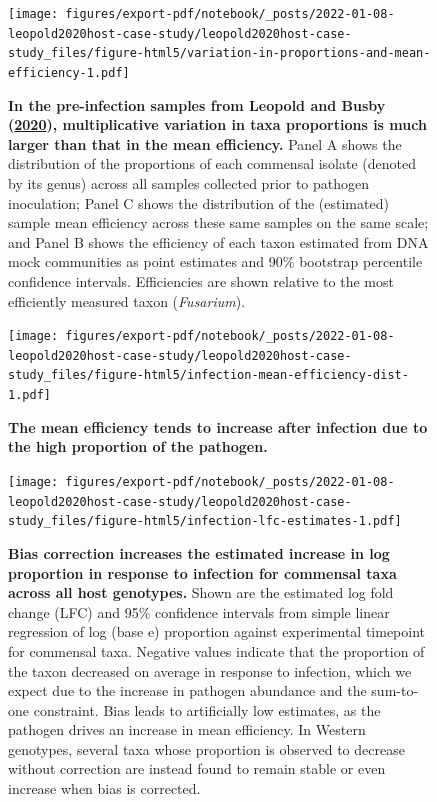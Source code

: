 \documentclass[
]{article}
\begin{document}
\begin{figure}
\centering
\texttt{[image: figures/export-pdf/notebook/\_posts/2022-01-08-leopold2020host-case-study/leopold2020host-case-study\_files/figure-html5/variation-in-proportions-and-mean-efficiency-1.pdf]}
\caption{\label{fig:leopold2020host-variation}\textbf{In the pre-infection samples from Leopold and Busby (\protect\hyperlink{ref-leopold2020host}{2020}), multiplicative variation in taxa proportions is much larger than that in the mean efficiency.} Panel A shows the distribution of the proportions of each commensal isolate (denoted by its genus) across all samples collected prior to pathogen inoculation; Panel C shows the distribution of the (estimated) sample mean efficiency across these same samples on the same scale; and Panel B shows the efficiency of each taxon estimated from DNA mock communities as point estimates and 90\% bootstrap percentile confidence intervals. Efficiencies are shown relative to the most efficiently measured taxon (\emph{Fusarium}).}
\end{figure}



\begin{figure}
\centering
\texttt{[image: figures/export-pdf/notebook/\_posts/2022-01-08-leopold2020host-case-study/leopold2020host-case-study\_files/figure-html5/infection-mean-efficiency-dist-1.pdf]}
\caption{\label{fig:leopold2020host-infection-mean-efficiency-dist}\textbf{The mean efficiency tends to increase after infection due to the high proportion of the pathogen.}}
\end{figure}



\begin{figure}
\centering
\texttt{[image: figures/export-pdf/notebook/\_posts/2022-01-08-leopold2020host-case-study/leopold2020host-case-study\_files/figure-html5/infection-lfc-estimates-1.pdf]}
\caption{\label{fig:leopold2020host-infection-lfc}\textbf{Bias correction increases the estimated increase in log proportion in response to infection for commensal taxa across all host genotypes.} Shown are the estimated log fold change (LFC) and 95\% confidence intervals from simple linear regression of log (base e) proportion against experimental timepoint for commensal taxa. Negative values indicate that the proportion of the taxon decreased on average in response to infection, which we expect due to the increase in pathogen abundance and the sum-to-one constraint. Bias leads to artificially low estimates, as the pathogen drives an increase in mean efficiency. In Western genotypes, several taxa whose proportion is observed to decrease without correction are instead found to remain stable or even increase when bias is corrected.}
\end{figure}
\end{document}
